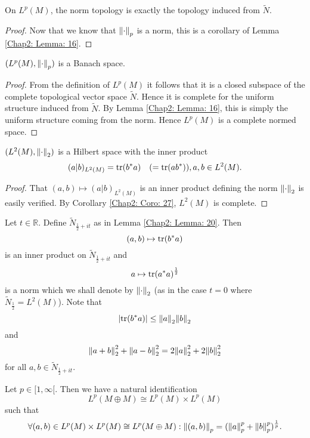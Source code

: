 \begin{proposition}
    On $L^p(M)$, the norm topology is exactly the topology induced from $\tilde{N}$.
\end{proposition}
\begin{proof}
    Now that we know that $\norm{\cdot}_p$ is a norm, this is a corollary of Lemma \ref{Chap2: Lemma: 16}.
\end{proof}
\begin{corollary}\label{Chap2: Coro: 27}
    $(L^p(M),\norm{\cdot}_p)$ is a Banach space.
\end{corollary}
\begin{proof}
    From the definition of $L^p(M)$ it follows that it is a closed subspace of the complete topological vector space $\tilde{N}$. Hence it is complete for the uniform structure induced from $\tilde{N}$. By Lemma \ref{Chap2: Lemma: 16}, this is simply the uniform structure coming from the norm. Hence $L^p(M)$ is a complete normed space.
\end{proof}
\begin{corollary}
    $(L^2(M),\norm{\cdot}_2)$ is a Hilbert space with the inner product
    \[
        (a|b)_{L^2(M)}=\tr(b^*a)\quad (=\tr(ab^*)),a,b\in L^2(M).
    \]
\end{corollary}
\begin{proof}
    That $(a,b)\mapsto (a|b)_{L^2(M)}$ is an inner product defining the norm $\norm{\cdot}_2$ is easily verified. By Corollary \ref{Chap2: Coro: 27}, $L^2(M)$ is complete.
\end{proof}
\begin{remark}\label{Chap2: Remark: 29}
    Let $t\in \mathbb{R}$. Define $\tilde{N}_{\frac{1}{2}+it}$ as in Lemma \ref{Chap2: Lemma: 20}. Then
    \[
        (a,b)\mapsto \tr(b^*a)
    \]
    is an inner product on $\tilde{N}_{\frac{1}{2}+it}$ and
    \[
        a\mapsto \tr(a^*a)^\frac{1}{2}
    \]
    is a norm which we shall denote by $\norm{\cdot}_2$ (as in the case $t=0$ where $\tilde{N}_{\frac{1}{2}}=L^2(M)$). Note that
    \[
        \abs{\tr(b^*a)}\leq \norm{a}_2\norm{b}_2
    \]
    and
    \[
        \norm{a+b}_2^2+\norm{a-b}_2^2=2\norm{a}_2^2+2\norm{b}_2^2
    \]
    for all $a,b\in \tilde{N}_{\frac{1}{2}+it}$.
\end{remark}
\begin{remark}\label{Chap2: Remark: 30}
    Let $p\in [1,\infty[$. Then we have a natural identification
    \begin{equation}\label{Chap2: eqn: 31}
        L^p(M\oplus M)\cong L^p(M)\times L^p(M)
    \end{equation}
    such that
    \begin{equation}\label{Chap2: eqn: 32}
        \forall (a,b)\in L^p(M)\times L^p(M)\cong L^p(M\oplus M):\norm{(a,b)}_p=(\norm{a}_p^p+\norm{b}_p^p)^\frac{1}{p}.
    \end{equation}
\end{remark}
